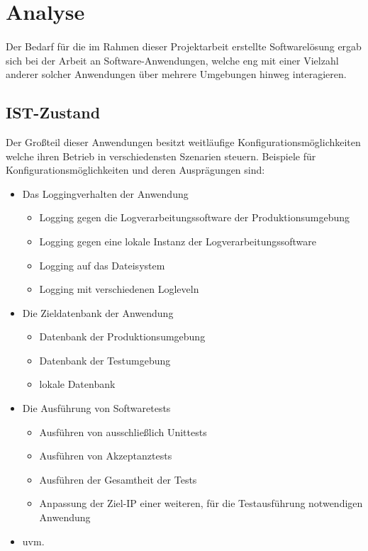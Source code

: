 \section{Analyse}
\paragraph{}
Der Bedarf für die im Rahmen dieser Projektarbeit erstellte Softwarelösung ergab
sich bei der Arbeit an Software-Anwendungen, welche eng mit einer Vielzahl
anderer solcher Anwendungen über mehrere Umgebungen hinweg interagieren.

\subsection{IST-Zustand}
Der Großteil dieser Anwendungen besitzt weitläufige Konfigurationsmöglichkeiten
welche ihren Betrieb in verschiedensten Szenarien steuern. Beispiele für
Konfigurationsmöglichkeiten und deren Ausprägungen sind:

\begin{itemize}
    \item Das Loggingverhalten der Anwendung
          \begin{itemize}
              \item Logging gegen die Logverarbeitungssoftware der Produktionsumgebung
              \item Logging gegen eine lokale Instanz der Logverarbeitungssoftware
              \item Logging auf das Dateisystem
              \item Logging mit verschiedenen Logleveln
          \end{itemize}
    \item Die Zieldatenbank der Anwendung \begin{itemize}
              \item Datenbank der Produktionsumgebung
              \item Datenbank der Testumgebung
              \item lokale Datenbank
          \end{itemize}
    \item Die Ausführung von Softwaretests \begin{itemize}
              \item Ausführen von ausschließlich Unittests
              \item Ausführen von Akzeptanztests
              \item Ausführen der Gesamtheit der Tests
              \item Anpassung der Ziel-IP einer weiteren, für die Testausführung
                    notwendigen Anwendung
          \end{itemize}
    \item uvm.
\end{itemize}


